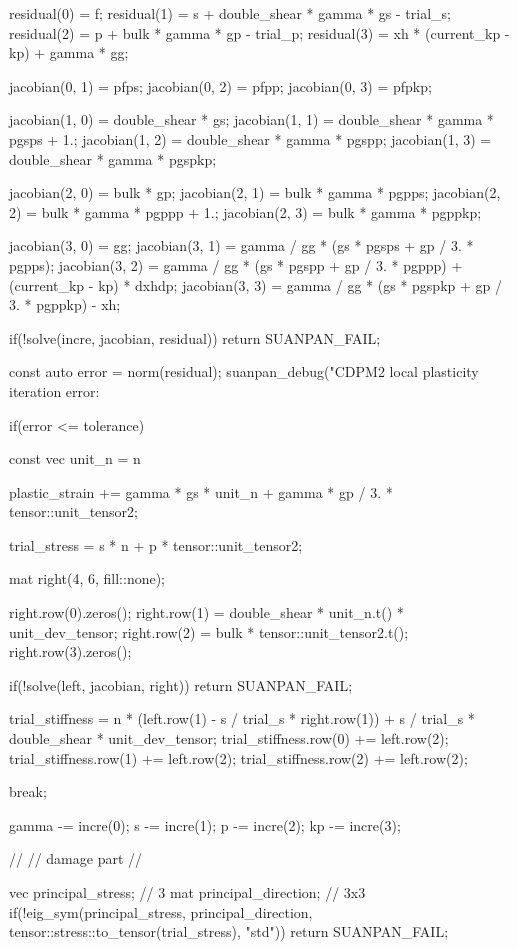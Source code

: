 \begin{cppcode}
{{		residual(0) = f;
		residual(1) = s + double_shear * gamma * gs - trial_s;
		residual(2) = p + bulk * gamma * gp - trial_p;
		residual(3) = xh * (current_kp - kp) + gamma * gg;

		jacobian(0, 1) = pfps;
		jacobian(0, 2) = pfpp;
		jacobian(0, 3) = pfpkp;

		jacobian(1, 0) = double_shear * gs;
		jacobian(1, 1) = double_shear * gamma * pgsps + 1.;
		jacobian(1, 2) = double_shear * gamma * pgspp;
		jacobian(1, 3) = double_shear * gamma * pgspkp;

		jacobian(2, 0) = bulk * gp;
		jacobian(2, 1) = bulk * gamma * pgpps;
		jacobian(2, 2) = bulk * gamma * pgppp + 1.;
		jacobian(2, 3) = bulk * gamma * pgppkp;

		jacobian(3, 0) = gg;
		jacobian(3, 1) = gamma / gg * (gs * pgsps + gp / 3. * pgpps);
		jacobian(3, 2) = gamma / gg * (gs * pgspp + gp / 3. * pgppp) + (current_kp - kp) * dxhdp;
		jacobian(3, 3) = gamma / gg * (gs * pgspkp + gp / 3. * pgppkp) - xh;

		if(!solve(incre, jacobian, residual)) return SUANPAN_FAIL;

		const auto error = norm(residual);
		suanpan_debug("CDPM2 local plasticity iteration error: %

		if(error <= tolerance) {
			const vec unit_n = n %

			plastic_strain += gamma * gs * unit_n + gamma * gp / 3. * tensor::unit_tensor2;

			trial_stress = s * n + p * tensor::unit_tensor2;

			mat right(4, 6, fill::none);

			right.row(0).zeros();
			right.row(1) = double_shear * unit_n.t() * unit_dev_tensor;
			right.row(2) = bulk * tensor::unit_tensor2.t();
			right.row(3).zeros();

			if(!solve(left, jacobian, right)) return SUANPAN_FAIL;

			trial_stiffness = n * (left.row(1) - s / trial_s * right.row(1)) + s / trial_s * double_shear * unit_dev_tensor;
			trial_stiffness.row(0) += left.row(2);
			trial_stiffness.row(1) += left.row(2);
			trial_stiffness.row(2) += left.row(2);

			break;
		}

		gamma -= incre(0);
		s -= incre(1);
		p -= incre(2);
		kp -= incre(3);
	}

	//
	// damage part
	//

	vec principal_stress;    // 3
	mat principal_direction; // 3x3
	if(!eig_sym(principal_stress, principal_direction, tensor::stress::to_tensor(trial_stress), "std")) return SUANPAN_FAIL;

}
\end{cppcode}
